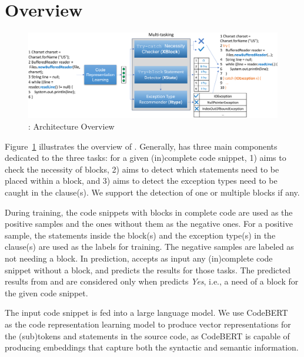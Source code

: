 \section{{\tool} Overview}
\label{sec:overview}

\begin{figure}[t] %
\begin{center}
\includegraphics[width=5.7in]{overview-6.png} %
\vspace{-10pt}
\caption{{\tool}: Architecture Overview}
\label{overview}
\end{center}
\end{figure}

Figure~\ref{overview} illustrates the overview of {\tool}. Generally,
{\tool} has three main components dedicated to the three tasks: for a
given (in)complete code snippet, 1) {\xblock} aims to check the
necessity of  blocks, 2){\xstate} aims to detect which
statements need to be placed within a  block, and 3) {\xtype}
aims to detect the exception types need to be caught in the
 clause(s). We support the detection of one or multiple
 blocks if any.

During training, the code snippets with  blocks in
complete code are used as the positive samples and the ones without
them as the negative ones. For a positive sample, the statements
inside the  block(s) and the exception type(s) in the
 clause(s) are used as the labels for training. The negative
samples are labeled as not needing a  block. In
prediction, {\tool} accepts as input any (in)complete code
snippet without a  block, and predicts the results for
those tasks. The predicted results from {\xstate} and {\xtype} are
considered only when {\xblock} predicts {\em Yes}, i.e., a need of a
 block for the given code snippet.

The input code snippet is fed into a large language model. We use
CodeBERT~\cite{codebert-emnlp20} as the code representation learning
model to produce vector representations for the (sub)tokens and
statements in the source code, as CodeBERT is capable of producing
embeddings that capture both the syntactic and semantic information.

